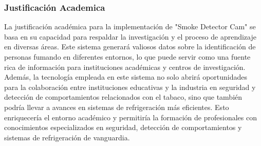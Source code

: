 \subsubsection{Justificación Academica} 
La justificación académica para la implementación de "Smoke Detector Cam" se basa en su capacidad para respaldar la investigación y el proceso de aprendizaje en diversas áreas. Este sistema generará valiosos datos sobre la identificación de personas fumando en diferentes entornos, lo que puede servir como una fuente rica de información para instituciones académicas y centros de investigación. Además, la tecnología empleada en este sistema no solo abrirá oportunidades para la colaboración entre instituciones educativas y la industria en seguridad y detección de comportamientos relacionados con el tabaco, sino que también podría llevar a avances en sistemas de refrigeración más eficientes. Esto enriquecería el entorno académico y permitiría la formación de profesionales con conocimientos especializados en seguridad, detección de comportamientos y sistemas de refrigeración de vanguardia.